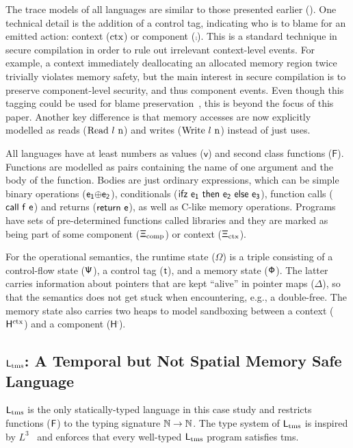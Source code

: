 \documentclass[dvipsnames,conference]{IEEEtran}
\theoremstyle{definition}
\begin{document}
{
  \renewcommand{\src}[1]{\mathsf{#1}}
The trace models of all languages are similar to those presented earlier ().
One technical detail is the addition of a control tag, indicating who is to blame for an emitted action: context ($\text{ctx}$) or component ($\comp$).
This is a standard technique in secure compilation in order to rule out irrelevant context-level events. 
For example, a context immediately deallocating an allocated memory region twice trivially violates memory safety, but the main interest in secure compilation is to preserve component-level security, and thus component events.
Even though this tagging could be used for blame preservation~\cite{patrignani2023blame}, this is beyond the focus of this paper.
Another key difference is that memory accesses are now explicitly modelled as reads ($\src{\ev{Read\ \loc\ n}}$) and writes ($\src{\ev{Write\ \loc\ n}}$) instead of just uses.

All languages have at least numbers as values ($\src{v}$) and second class functions ($\src{F}$).
Functions are modelled as pairs containing the name of one argument and the body of the function.
Bodies are just ordinary expressions, which can be simple binary operations ($\src{\lbinop{\expr[_1]}{\expr[_2]}}$), conditionals ($\src{\lifz{\expr[_1]}{\expr[_2]}{\expr[_3]}}$), function calls ($\src{\lcall{f}{e}}$) and returns ($\src{\lreturn{\expr}}$), as well as C-like memory operations. 
Programs have sets of pre-determined functions called libraries and they are marked as being part of some component ($\src{\library_{\comp}}$) or context ($\src{\library_{\ctx}}$).

For the operational semantics, the runtime state ($\src{\Omega}$) is a triple consisting of a control-flow state ($\src{\cfstate}$), a control tag ($\src{\sandboxtag{}}$), and a memory state ($\src{\memstate}$). 
The latter carries information about pointers that are kept ``alive'' in pointer maps ($\src{\Delta}$), so that the semantics does not get stuck when encountering, e.g., a double-free.
The memory state also carries two heaps to model sandboxing between a context ($\src{H^{\ctx}}$) and a component ($\src{H^{\comp}}$).

}

\subsection{$\src{L_{\tmssafe}}$: A Temporal but Not Spatial Memory Safe Language}\label{subsec:ltms}

$\src{L_{\tmssafe}}$ is the only statically-typed language in this case study and restricts functions ($\src{F}$) to the typing signature $\src{\natt\to\natt}$. 
The type system of $\src{L_{\tmssafe}}$ is inspired by $L^{3}$~\cite{morrisett2005L3,scherer2018fabulous} and enforces that every well-typed $\src{L_{\tmssafe}}$ program satisfies \gls*{tms}.
\end{document}
